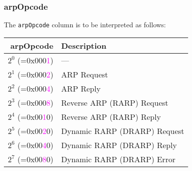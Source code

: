 \documentclass[documentation]{subfiles}
\begin{document}
\subsubsection{arpOpcode}\label{arpOpcode}
The {\tt arpOpcode} column is to be interpreted as follows:\\
\begin{minipage}{.46\textwidth}
    \begin{longtable}{rl}
        \toprule
        {\bf arpOpcode} & {\bf Description}\\
        \midrule\endhead%
        $2^{0}$  (=0x000\textcolor{magenta}{1}) & ---\\
        $2^{1}$  (=0x000\textcolor{magenta}{2}) & ARP Request\\
        $2^{2}$  (=0x000\textcolor{magenta}{4}) & ARP Reply\\
        $2^{3}$  (=0x000\textcolor{magenta}{8}) & Reverse ARP (RARP) Request\\
        $2^{4}$  (=0x00\textcolor{magenta}{1}0) & Reverse ARP (RARP) Reply\\
        $2^{5}$  (=0x00\textcolor{magenta}{2}0) & Dynamic RARP (DRARP) Request\\
        $2^{6}$  (=0x00\textcolor{magenta}{4}0) & Dynamic RARP (DRARP) Reply\\
        $2^{7}$  (=0x00\textcolor{magenta}{8}0) & Dynamic RARP (DRARP) Error\\
        \bottomrule
    \end{longtable}
\end{minipage}
\hfill
\end{document}
